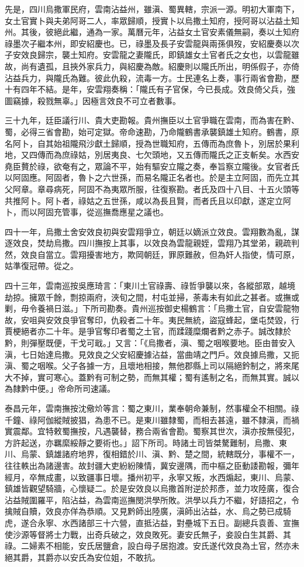 \begin{pinyinscope}
先是，四川烏撒軍民府，雲南沾益州，雖滇、蜀異轄，宗派一源。明初大軍南下，女土官實卜與夫弟阿哥二人，率眾歸順，授實卜以烏撒土知府，授阿哥以沾益土知州。其後，彼絕此繼，通為一家。萬曆元年，沾益女土官安素儀無嗣，奏以土知府祿墨次子繼本州，即安紹慶也。已，祿墨及長子安雲龍與兩孫俱歿，安紹慶奏以次子安效良歸宗，襲土知府。安雲龍之妻隴氏，即鎮雄女土官者氏之女也，以雲龍雖故，尚有遺孤，且挾外家兵力，與紹慶為敵。紹慶則以隴氏所出，明係假子，亦倚沾益兵力，與隴氏為難。彼此仇殺，流毒一方。士民連名上奏，事行兩省會勘，歷十有四年不結。是年，安雲翔奏稱：「隴氏有子官保，今已長成。效良倚父兵，強圖竊據，殺戮無辜。」因極言效良不可立者數事。

三十九年，廷臣議行川、貴大吏勘報。貴州撫臣以土官爭職在雲南，而為害在黔、蜀，必得三省會勘，始可定獄。帝命速勘，乃命隴鶴書承襲鎮雄土知府。鶴書，原名阿卜，自其始祖隴飛沙獻土歸順，授為世職知府，五傳而為庶魯卜，別居於果利地，又四傳而為庶祿姑，別居夷良、七欠頭地，又五傳而隴氏之正支斬矣。水西安堯臣贅於祿，欲奄有之，眾論不平，始有驅安立隴之奏，奉旨察立隴後。女官者氏以阿固應。阿固者，魯卜之六世孫，而易名隴正名者也。於是主立阿固，而先立其父阿章。章尋病死，阿固不為夷眾所服，往復察勘。者氏及四十八目、十五火頭等共推阿卜。阿卜者，祿姑之五世孫，咸以為長且賢，而者氏且以印獻，遂定立阿卜，而以阿固充管事，從巡撫喬應星之議也。

四十一年，烏撒土舍安效良初與安雲翔爭立，朝廷以嫡派立效良。雲翔數為亂，謀逐效良，焚劫烏撒。四川撫按上其事，以效良為雲龍親姪，雲翔乃其堂弟，親疏判然，效良自當立。雲翔擾害地方，欺岡朝廷，罪原難赦，但為奸人指使，情可原，姑準復冠帶。從之。

四十三年，雲南巡按吳應琦言：「東川土官祿壽、祿哲爭襲以來，各縱部眾，越境劫掠。擁眾千餘，剽掠兩府，浹旬之間，村屯並掃，荼毒未有如此之甚者。或撫或剿，毋令養禍日滋。」下所司勘奏。貴州巡按御史楊鶴言：「烏撒土官，自安雲龍物故，安咀與安效良爭官奪印，仇殺者二十年。夷民無統，盜寇蜂起，堡屯焚毀，行賈梗絕者亦二十年。是爭官奪印者蜀之土官，而蹂踐糜爛者黔之赤子。誠改隸於黔，則彈壓既便，干戈可戢。」又言：「《烏撒者，滇、蜀之咽喉要地。臣由普安入滇，七日始達烏撒。見效良之父安紹慶據沾益，當曲靖之門戶。效良據烏撒，又扼滇、蜀之咽喉。父子各據一方，且壞地相接，無他郡縣上司以隔絕鈐制之，將來尾大不掉，實可寒心。蓋黔有可制之勢，而無其權；蜀有遙制之名，而無其實。誠以為隸黔中便。」帝命所司速議。

泰昌元年，雲南撫按沈儆炌等言：蜀之東川，業奉朝命兼制，然事權全不相關。祿千鐘、祿阿伽縱賊披猖，為患不已。是東川雖隸蜀，而相去甚遠，雖不隸滇，而禍實震鄰。宜特敕蜀撫按，凡遇襲替，務合兩省會勘。蜀察其世次，滇亦按無侵犯，方許起送，亦羈縻綏靜之要術也。」詔下所司。時諸土司皆桀驁難制，烏撒、東川、烏蒙、鎮雄諸府地界，復相錯於川、滇、黔、楚之間，統轄既分，事權不一，往往軼出為諸邊害。故封疆大吏紛紛陳情，冀安邊隅，而中樞之臣動諉勘報，彌年經月，卒無成畫，以致疆事日壞。播州初平，永寧又叛，水西煽起，東川、烏蒙、鎮雄皆觀望騎牆，心懷疑二。於是安效良以烏撒首附逆於邦彥，並力攻陸廣，復合沾益賊圍羅平，陷沾益，為雲南巡撫閔洪學所敗。洪學以兵力不繼，好語招之，令擒賊自贖，效良亦佯為恭順。又見黔師出陸廣，滇師出沾益，水、烏之勢已成騎虎，遂合永寧、水西諸部三十六營，直抵沾益，對壘城下五日。副總兵袁善、宣撫使沙源等督將士力戰，出奇兵破之，效良敗死。妻安氏無子，妾設白生其爵、其祿。二婦素不相能，安氏居鹽倉，設白母子居抱渡。安氏遂代效良為土官，然亦未絕其爵，其爵亦以安氏為安位姐，不敢抗。


\end{pinyinscope}

